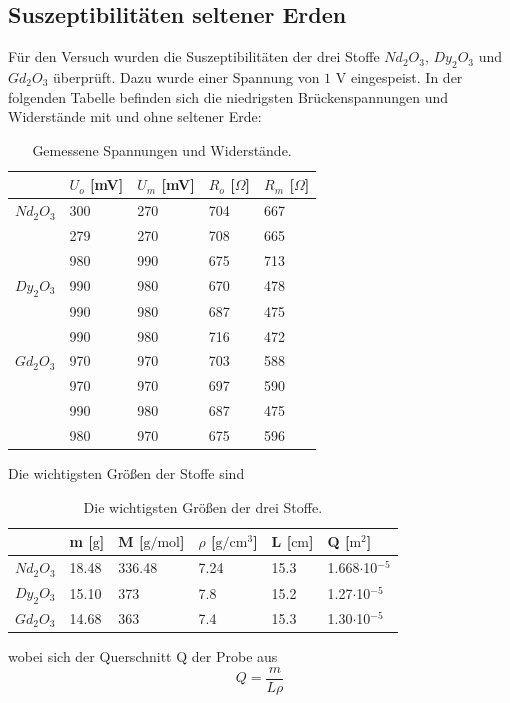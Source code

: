 \subsection{Suszeptibilitäten seltener Erden}
Für den Versuch wurden die Suszeptibilitäten der drei Stoffe $Nd_2 O_3$, $Dy_2 O_3$ und $Gd_2 O_3$ überprüft. Dazu wurde einer Spannung von $1$ V eingespeist. In der folgenden Tabelle befinden sich die niedrigsten Brückenspannungen und Widerstände mit und ohne seltener Erde:
\begin{table}[H]
  \centering
  \caption{Gemessene Spannungen und Widerstände.}
  \begin{tabular}{l|l|l|l|l}
  & $U_{o}$ [mV] & $U_{m}$ [mV] & $R_{o}$ [$\Omega$] & $R_{m}$ [$\Omega$]\\ \hline
  $Nd_2 O_3$ & 300 & 270 & 704 & 667\\
  & 279 & 270 & 708 & 665\\
  & 980 & 990 & 675 & 713\\ \hline
  $Dy_2 O_3$ & 990 & 980 & 670 & 478\\
  & 990 & 980 & 687 & 475\\
  & 990 & 980 & 716 & 472\\ \hline
  $Gd_2 O_3$ & 970 & 970 & 703 & 588\\
  & 970 & 970 & 697 & 590\\
  & 990 & 980 & 687 & 475\\
  & 980 & 970 & 675 & 596\\ \hline
  \end{tabular}
\end{table}
Die wichtigsten Größen der Stoffe sind
\begin{table}[H]
  \centering
  \caption{Die wichtigsten Größen der drei Stoffe.}
  \begin{tabular}{l|l|l|l|l|l}
  & m [$\mathrm{g}$] & M [$\mathrm{g/mol}$] & $\rho$ [$\mathrm{g/cm^3}$] & L [$\mathrm{cm}$] & Q [$\mathrm{m^2}$]\\ \hline
  $Nd_2 O_3$ & 18.48 & 336.48 & 7.24 & 15.3 & 1.668$\cdot$10$^{-5}$ \\ \hline
  $Dy_2 O_3$ & 15.10 & 373 & 7.8 & 15.2 & 1.27$\cdot$10$^{-5}$ \\ \hline
  $Gd_2 O_3$ & 14.68 & 363 & 7.4 & 15.3 & 1.30$\cdot$10$^{-5}$ \\ \hline
  \end{tabular}
\end{table}
wobei sich der Querschnitt Q der Probe aus 
\begin{equation*}
  Q=\frac{m}{L\rho}
\end{equation*}
